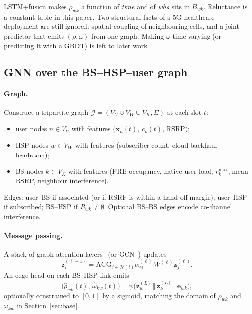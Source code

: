 \documentclass[journal,a4paper,10pt]{IEEEtran}
\begin{document}
LSTM+fusion makes \(\rho_{wk}\) a function of \emph{time} and of \emph{who} sits in \(B_{wk}\). Reluctance is a constant table in this paper. Two structural facts of a 5G healthcare deployment are still ignored: spatial coupling of neighbouring cells, and a joint predictor that emits \((\rho,\omega)\) from one graph. Making \(\omega\) time-varying (or predicting it with a GBDT) is left to later work.

\subsection{GNN over the BS--HSP--user graph}
\label{sec:gnn}

\paragraph{Graph.}
Construct a tripartite graph \(\mathcal{G}=(V_U\cup V_W\cup V_K,E)\) at each slot \(t\):
\begin{itemize}
  \item user nodes \(n\in V_U\) with features \(\bigl(\mathbf{x}_n(t),\,c_n(t),\,\text{RSRP}\bigr)\);
  \item HSP nodes \(w\in V_W\) with features (subscriber count, cloud-backhaul headroom);
  \item BS nodes \(k\in V_K\) with features (PRB occupancy, native-user load, \(r_k^{\max}\), mean RSRP, neighbour interference).
\end{itemize}
Edges: user--BS if associated (or if RSRP is within a hand-off margin); user--HSP if subscribed; BS--HSP if \(B_{wk}\neq\emptyset\). Optional BS--BS edges encode co-channel interference.

\paragraph{Message passing.}
A stack of graph-attention layers~\cite{velickovic2018gat} (or GCN~\cite{kipf2017gcn}) updates
\begin{equation}
  \mathbf{z}_i^{(\ell+1)}
  =\mathrm{AGG}_{j\in\mathcal{N}(i)}
  \alpha_{ij}^{(\ell)}\,W^{(\ell)}\mathbf{z}_j^{(\ell)}.
\end{equation}
An edge head on each BS--HSP link emits
\begin{equation}
  \bigl(\hat\rho_{wk}(t),\,\hat\omega_{kw}(t)\bigr)
  =\psi\bigl(\mathbf{z}_w^{(L)}\,\Vert\,\mathbf{z}_k^{(L)}\,\Vert\,\mathbf{e}_{wk}\bigr),
  \label{eq:gnn-head}
\end{equation}
optionally constrained to \([0,1]\) by a sigmoid, matching the domain of \(\rho_{wk}\) and \(\omega_{kw}\) in Section~\ref{sec:base}.
\end{document}
